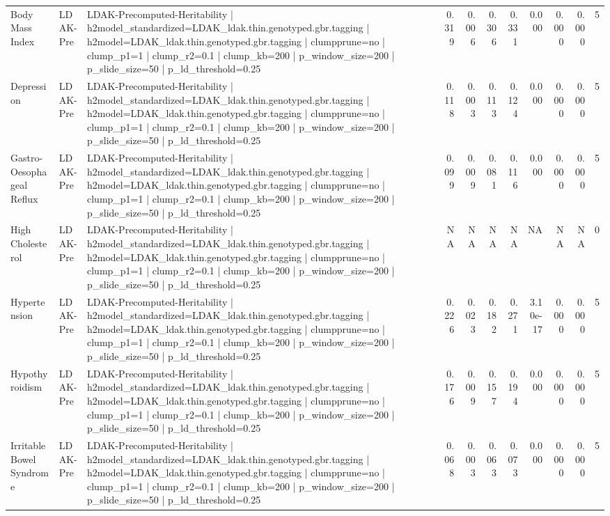 \begin{landscape}
\begin{longtable}{p{2.4cm}p{1.8cm}p{6.0cm}rrrrrrrr}
Body Mass Index & LDAK-Pre & LDAK-Precomputed-Heritability | h2model\_standardized=LDAK\_ldak.thin.genotyped.gbr.tagging | h2model=LDAK\_ldak.thin.genotyped.gbr.tagging | clumpprune=no | clump\_p1=1 | clump\_r2=0.1 | clump\_kb=200 | p\_window\_size=200 | p\_slide\_size=50 | p\_ld\_threshold=0.25 & 0.319 & 0.006 & 0.306 & 0.331 & 0.000 & 0.000 & 0.000 & 5 \\
Depression & LDAK-Pre & LDAK-Precomputed-Heritability | h2model\_standardized=LDAK\_ldak.thin.genotyped.gbr.tagging | h2model=LDAK\_ldak.thin.genotyped.gbr.tagging | clumpprune=no | clump\_p1=1 | clump\_r2=0.1 | clump\_kb=200 | p\_window\_size=200 | p\_slide\_size=50 | p\_ld\_threshold=0.25 & 0.118 & 0.003 & 0.113 & 0.124 & 0.000 & 0.000 & 0.000 & 5 \\
Gastro-Oesophageal Reflux & LDAK-Pre & LDAK-Precomputed-Heritability | h2model\_standardized=LDAK\_ldak.thin.genotyped.gbr.tagging | h2model=LDAK\_ldak.thin.genotyped.gbr.tagging | clumpprune=no | clump\_p1=1 | clump\_r2=0.1 | clump\_kb=200 | p\_window\_size=200 | p\_slide\_size=50 | p\_ld\_threshold=0.25 & 0.099 & 0.009 & 0.081 & 0.116 & 0.000 & 0.000 & 0.000 & 5 \\
High Cholesterol & LDAK-Pre & LDAK-Precomputed-Heritability | h2model\_standardized=LDAK\_ldak.thin.genotyped.gbr.tagging | h2model=LDAK\_ldak.thin.genotyped.gbr.tagging | clumpprune=no | clump\_p1=1 | clump\_r2=0.1 | clump\_kb=200 | p\_window\_size=200 | p\_slide\_size=50 | p\_ld\_threshold=0.25 & NA & NA & NA & NA & NA & NA & NA & 0 \\
Hypertension & LDAK-Pre & LDAK-Precomputed-Heritability | h2model\_standardized=LDAK\_ldak.thin.genotyped.gbr.tagging | h2model=LDAK\_ldak.thin.genotyped.gbr.tagging | clumpprune=no | clump\_p1=1 | clump\_r2=0.1 | clump\_kb=200 | p\_window\_size=200 | p\_slide\_size=50 | p\_ld\_threshold=0.25 & 0.226 & 0.023 & 0.182 & 0.271 & 3.10e-17 & 0.000 & 0.000 & 5 \\
Hypothyroidism & LDAK-Pre & LDAK-Precomputed-Heritability | h2model\_standardized=LDAK\_ldak.thin.genotyped.gbr.tagging | h2model=LDAK\_ldak.thin.genotyped.gbr.tagging | clumpprune=no | clump\_p1=1 | clump\_r2=0.1 | clump\_kb=200 | p\_window\_size=200 | p\_slide\_size=50 | p\_ld\_threshold=0.25 & 0.176 & 0.009 & 0.157 & 0.194 & 0.000 & 0.000 & 0.000 & 5 \\
Irritable Bowel Syndrome & LDAK-Pre & LDAK-Precomputed-Heritability | h2model\_standardized=LDAK\_ldak.thin.genotyped.gbr.tagging | h2model=LDAK\_ldak.thin.genotyped.gbr.tagging | clumpprune=no | clump\_p1=1 | clump\_r2=0.1 | clump\_kb=200 | p\_window\_size=200 | p\_slide\_size=50 | p\_ld\_threshold=0.25 & 0.068 & 0.003 & 0.063 & 0.073 & 0.000 & 0.000 & 0.000 & 5 \\

\end{longtable}
\end{landscape}
